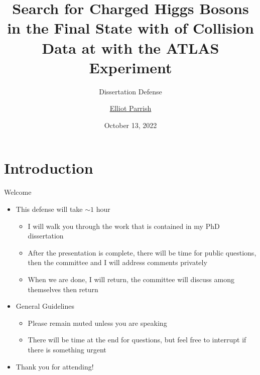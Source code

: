 \documentclass[aspectratio=169,xcolor=table]{beamer}
\title[Search for \HpmLong with ATLAS]
{Search for Charged Higgs Bosons in the \taulep Final State with \LUMI of \pp Collision Data at \sqs with the ATLAS Experiment}
\subtitle{Dissertation Defense}
\author[Elliot Parrish]
{\texorpdfstring{\underline{Elliot Parrish}}{Elliot Parrish}\inst{\dag}}
\institute[NIU] {\inst{\dag}Northern Illinois University, USA}
\date{October 13, 2022}
\begin{document}
\frame{\titlepage}




\begin{frame}{\contentsname}
  \begin{multicols}{2}
    \tableofcontents
  \end{multicols}
\end{frame}

\section{Introduction }
  
  \begin{frame}[t]{Welcome}
    \begin{itemize}
      \item This defense will take $\sim 1$ hour
      \begin{itemize}
        \item I will walk you through the work that is contained in my PhD dissertation
        \item After the presentation is complete, there will be time for public questions, then the committee and I will address comments privately
        \item When we are done, I will return, the committee will discuss among themselves then return
      \end{itemize}
      \item General Guidelines
      \begin{itemize}
        \item Please remain muted unless you are speaking
        \item There will be time at the end for questions, but feel free to interrupt if there is something urgent
      \end{itemize}
      \item Thank you for attending!
    \end{itemize}
  \end{frame}
\end{document}

